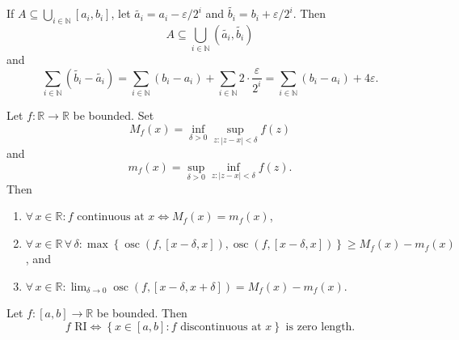 \documentclass{notes}
\begin{document}
\begin{prf}
  If $A \subseteq \bigcup_{i \in \mathbb N} [a_i, b_i]$, let $\tilde{a_i} = a_i - \varepsilon / 2^i$ and $\tilde{b_i} = b_i + \varepsilon / 2^i$.
  Then 
  \[
    A \subseteq \bigcup_{i \in \mathbb N} (\tilde{a_i}, \tilde{b_i})
  \]
  and 
  \[
    \sum_{i \in \mathbb N} (\tilde{b_i} - \tilde{a_i}) = \sum_{i \in \mathbb N} (b_i - a_i) + \sum_{i \in \mathbb N} 2 \cdot \frac{\varepsilon}{2^i} = \sum_{i \in \mathbb N} (b_i - a_i) + 4 \varepsilon.
  \]
\end{prf}

\begin{lem}
  Let $f \colon \mathbb R \to \mathbb R$ be bounded.
  Set 
  \[ 
    M_f(x) = \inf_{\delta > 0} \sup_{z : \left | z - x \right | < \delta} f(z)
  \]
  and 
  \[
    m_f(x) = \sup_{\delta > 0} \inf_{z : \left | z - x \right | < \delta} f(z).
  \]
  Then 
  \begin{enumerate}
    \item $\forall \, x \in \mathbb R: \text{$f$ continuous at $x$} \Leftrightarrow M_f(x) = m_f(x)$, 
      
    \item $\forall \, x \in \mathbb R \, \forall \, \delta: \max \left \{ \operatorname{osc}(f, [x - \delta, x]), \operatorname{osc}(f, [x - \delta, x]) \right \} \geq M_f(x) - m_f(x)$, and 
      
    \item $\forall \, x \in \mathbb R: \lim_{\delta \to 0} \operatorname{osc}(f, [x - \delta, x + \delta]) = M_f(x) - m_f(x)$.
  \end{enumerate}
\end{lem}

\begin{thm}
  Let $f \colon [a, b] \to \mathbb R$ be bounded.
  Then 
  \[
    f \text{ RI} \Leftrightarrow \left \{ x \in [a, b] : \text{$f$ discontinuous at $x$} \right \} \text{ is zero length}.
  \]
\end{thm}
\end{document}
